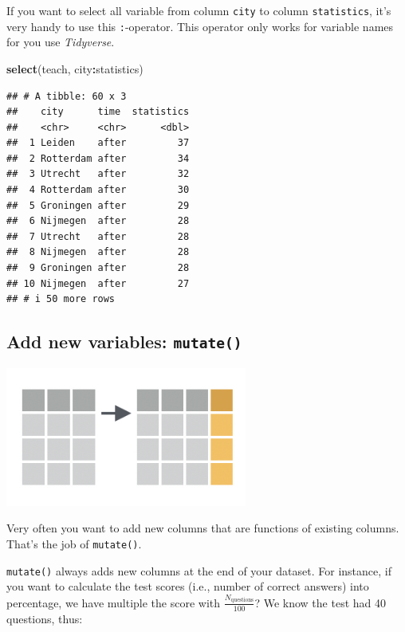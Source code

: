 \documentclass[
]{scrartcl}
\newenvironment{Shaded}{\begin{snugshade}}{\end{snugshade}}
\newcommand{\FunctionTok}[1]{\textcolor[rgb]{0.13,0.29,0.53}{\textbf{#1}}}
\newcommand{\NormalTok}[1]{#1}
\newcommand{\SpecialCharTok}[1]{\textcolor[rgb]{0.81,0.36,0.00}{\textbf{#1}}}
\begin{document}
If you want to select all variable from column \texttt{city} to column \texttt{statistics}, it's very handy to use this \texttt{:}-operator. This operator only works for variable names for you use \emph{Tidyverse}.

\begin{Shaded}
\begin{Highlighting}[]
\FunctionTok{select}\NormalTok{(teach, city}\SpecialCharTok{:}\NormalTok{statistics)}
\end{Highlighting}
\end{Shaded}

\begin{verbatim}
## # A tibble: 60 x 3
##    city      time  statistics
##    <chr>     <chr>      <dbl>
##  1 Leiden    after         37
##  2 Rotterdam after         34
##  3 Utrecht   after         32
##  4 Rotterdam after         30
##  5 Groningen after         29
##  6 Nijmegen  after         28
##  7 Utrecht   after         28
##  8 Nijmegen  after         28
##  9 Groningen after         28
## 10 Nijmegen  after         27
## # i 50 more rows
\end{verbatim}

\subsection{\texorpdfstring{Add new variables: \texttt{mutate()}}{Add new variables: mutate()}}\label{add-new-variables-mutate}

\begin{center}\includegraphics[width=300px]{images/dplyr-mutate} \end{center}

Very often you want to add new columns that are functions of existing columns. That's the job of \texttt{mutate()}.

\texttt{mutate()} always adds new columns at the end of your dataset. For instance, if you want to calculate the test scores (i.e., number of correct answers) into percentage, we have multiple the score with \(\frac{N_\text{questions}}{100}\)? We know the test had 40 questions, thus:
\end{document}
